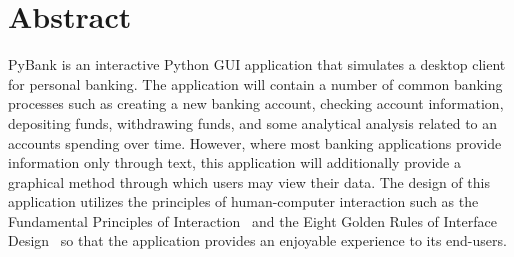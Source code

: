 \section{Abstract}
\label{sect:abstract}

PyBank is an interactive Python GUI application that simulates a desktop client for personal banking. The application will contain a number of common banking processes such as creating a new banking account, checking account information, depositing funds, withdrawing funds, and some analytical analysis related to an accounts spending over time. However, where most banking applications provide information only through text, this application will additionally provide a graphical method through which users may view their data. The design of this application utilizes the principles of human-computer interaction such as the Fundamental Principles of Interaction~\cite{THE_DESIGN_OF_EVERYDAY_THINGS:0} and the Eight Golden Rules of Interface Design~\cite{DESIGNING_THE_USER_INTERFACE:6} so that the application provides an enjoyable experience to its end-users.


